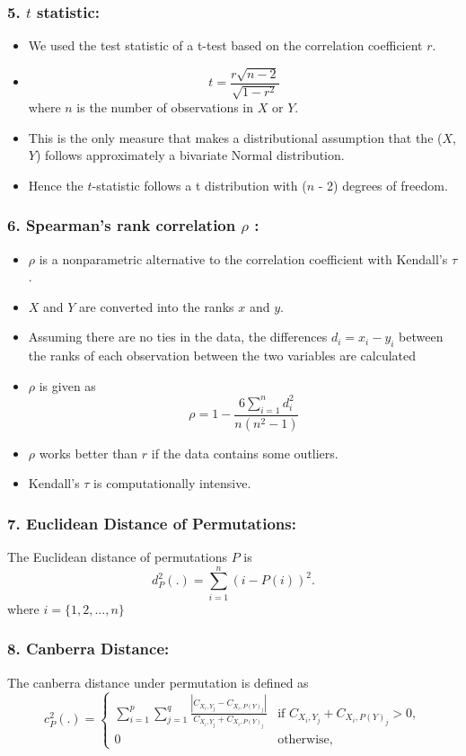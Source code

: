 \documentclass{beamer}
\begin{document}
\begin{frame}
\frametitle{5. $t$ statistic: }
\begin{itemize}
\item We used the test statistic of a t-test based on the correlation coefficient $r$. 
\item  $$t =\frac{r \sqrt{n - 2}}{\sqrt{1 - r^2}}$$ where $n$ is the number of observations in $X$ or $Y$. 
\item This is the only measure that makes a distributional assumption that the ($X$,$Y$) follows approximately a bivariate Normal distribution. 
\item Hence the $t$-statistic follows a t distribution with ($n$ - 2) degrees of freedom.
\end{itemize}
\end{frame}

\begin{frame}
\frametitle{6. Spearman's rank correlation $\rho$ : }
\begin{itemize}
\item $\rho$ is a nonparametric alternative to the correlation coefficient with Kendall's $\tau$. 
\item $X$ and $Y$ are converted into the ranks $x$ and $y$. 
\item Assuming there are no ties in the data, the differences $d_i=x_i - y_i$ between the ranks of each observation between the two variables are calculated 
\item $\rho$ is given as $$\rho = 1 - \frac{6\sum_{i=1}^n d_i^2}{n(n^2 - 1)}$$ 
\item $\rho$ works better than $r$ if the data contains some outliers. 
\item Kendall's $\tau$ is computationally intensive.
\end{itemize}
\end{frame}

\begin{frame}
\frametitle{7. Euclidean Distance of Permutations:}

The Euclidean distance of permutations $P$ is 
\[
d^2_P(.) = \sum_{i=1}^n ( i - P(i))^2.
\]
where $i = \{1, 2, ..., n\}$

\end{frame}

\begin{frame}
\frametitle{8. Canberra Distance:}
The canberra distance under permutation is defined as
\[
c^2_P(.)  = \left \{ 
\begin{array}{ll}
\sum_{i=1}^p \sum_{j=1}^q \frac{ |C_{X_i,Y_j} - C_{X_i,P(Y)_j}|}{ C_{X_i,Y_j} + C_{X_i,P(Y)_j}} & \text{if } C_{X_i,Y_j} + C_{X_i,P(Y)_j} > 0,\\
0 & \text{otherwise},
\end{array} \right.
\]

\end{frame}
\end{document}
